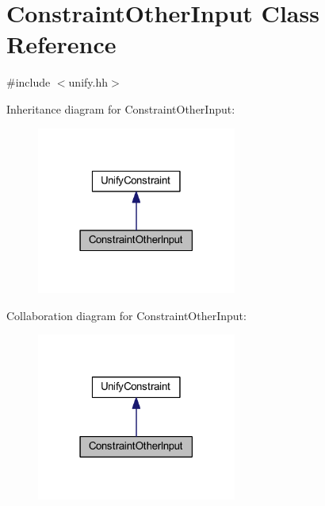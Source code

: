\hypertarget{class_constraint_other_input}{}\section{Constraint\+Other\+Input Class Reference}
\label{class_constraint_other_input}


{\ttfamily \#include $<$unify.\+hh$>$}



Inheritance diagram for Constraint\+Other\+Input\+:
\nopagebreak
\begin{figure}[H]
\begin{center}
\leavevmode
\includegraphics[width=186pt]{class_constraint_other_input__inherit__graph}
\end{center}
\end{figure}


Collaboration diagram for Constraint\+Other\+Input\+:
\nopagebreak
\begin{figure}[H]
\begin{center}
\leavevmode
\includegraphics[width=186pt]{class_constraint_other_input__coll__graph}
\end{center}
\end{figure}
